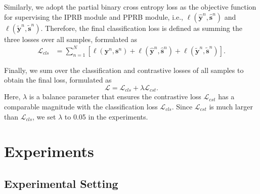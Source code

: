 \documentclass[lettersize,journal]{IEEEtran}
\begin{document}
Similarly, we adopt the partial binary cross entropy loss as the objective function for supervising the IPRB module and PPRB module, i.e., $\ell(\hat{\textbf{y}}^{n}, \hat{\textbf{s}}^{n})$ and $\ell(\tilde{\textbf{y}}^{n}, \tilde{\textbf{s}}^{n})$. Therefore, the final classification loss is defined as summing the three losses over all samples, formulated as
\begin{equation}
 \begin{aligned}
  \mathcal{L}_{cls} &= \sum^{N}_{n=1}{ [ \ell(\textbf{y}^n, \textbf{s}^n) + \ell(\hat{\textbf{y}}^{n}, \hat{\textbf{s}}^{n}) + \ell(\tilde{\textbf{y}}^{n}, \tilde{\textbf{s}}^{n}) ] }.
 \end{aligned}
\label{eq:cls-loss}
\end{equation}

Finally, we sum over the classification and contrastive losses of all samples to obtain the final loss, formulated as
\begin{equation}
\mathcal{L}=\mathcal{L}_{cls} + \lambda \mathcal{L}_{cst}.
\label{eq:total-loss}
\end{equation}
Here, $\lambda$ is a balance parameter that ensures the contrastive loss $\mathcal{L}_{cst}$ has a comparable magnitude with the classification loss $\mathcal{L}_{cls}$. Since $\mathcal{L}_{cst}$ is much larger than $\mathcal{L}_{cls}$, we set $\lambda$ to 0.05 in the experiments.

\section{Experiments} \label{sec:experiments}

\subsection{Experimental Setting}
\end{document}
